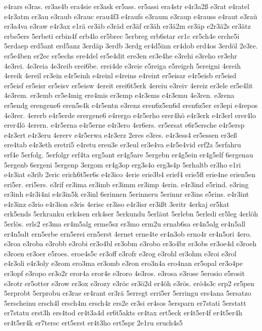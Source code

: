 {e4rars
e3ras.
er3as4b
era4sie
er3ask
er5ass.
er5assi
era4str
e4r3a2ß
e3rat
e4ratel
e4r3atm
er3au
e3raub
e3rauc
erau4f3
e4raufs
e3raum
e3raup
e4rauss
e4raut
e3raü
er3a4va
e3raw
e4r3ax
e1rä
er3äb
e3räd
er3äf
er3äh
er3ä2m
er3äp
e2r3ä2s
er3ätz
erbe5ers
5erbeti
erbin4f
erb4lo
er5brec
5erbreg
erb6star
er1c
er5ch4e
erche5i
5erdaep
erd5ant
erd5anz
3erdäp
3erdb
3erdg
er4d5inn
er4dob
erd4os
3erdöl
2e3re.
er5e4ben
er2ec
er5echs
ere4del
er5e4dit
ere3en
er3e4he
e3rehi
e3reho
er3ehr
4e3rei.
4e3reia
4e3reib
erei6be.
erei4de
e3reie
e5reiga
e5reigeh
5ereigni
4ereih
4ereik
4ereil
er3ein
e4r5einh
e4reinl
e4reins
e4reint
er5eisar
e4r5eisb
er5eisd
er5eisf
er5eisr
er5eisv
er5eisw
4ereit
erei6t5erk
4ereiu
e3reiv
4ereiz
er3ele
er5e4lit
4e3rem.
er3emb
er5e4mig
ere4mis
er3emp
e4r3ems
e4r3emu
4e3ren.
e3rena
er5endg
erengene6
eren5s4k
e4r5entn
e3renz
eren6z5en6d
eren6z5er
er3epi
e4repos
4e3rer.
4ererb
e4r5erde
erergene6
e4rergo
e4r5erho
erer4hö
e4r3erk
e4r3erl
erer4lo
erer4lö
4erern.
e4r5erna
e4r5erne
e4r3ero
4er6ers.
er5ersat
e6r5ersche
e4r5ersp
e4r3ert
e4r3eru
4ererv
e4r5erwa
e4r3erz
2eres
e3res.
e4r3ess4
er5essen
er3eß
ere4tab
e4r3eth
eretri5
e4retu
ereu3e
er3eul
er3e4va
e4r5e4vid
erf2a
5erfahru
erf4e
5erfolg.
5erfolgr
erf4ta
erg5ant
er4g5are
5ergebn
er4g5ein
er4g5elf
6ergenau
5ergenb
6ergeni
5ergenp
3ergom
er4g3op
erg3s4o
erg3s4p
5erhaltb
er3ho
e1ri
e4r3iat
e3rib
2eric
erich6t5er6s
e4r3ico
4erie
erie3b4
erief4
erie5fl
erie4ne
erien5en
eri5er.
eri5ers.
e3rif
er3ima
er3imb
er3imm
er3imp
4erin.
e4r3ind
e5rind.
e3ring
er3inh
e4r3i4ni
e4r3in5k
er3inl
6erinnen
5erinneru
5erinnr
er3ins
e5rins.
e4r3int
e4r3inz
e3rio
e4r3ion
e3ris
4erisc
er3iso
e4r3isr
er3ißt
3eritr
4erkaj
er5kat
erk5ends
5erkranku
erk4sen
erk4ser
5erkundu
5erläut
5erlebn
5erledi
er5leg
4erlöh
5erlös.
erls2
er3ma
er4m5alg
erme5sz
er3mo
erm2u
ernab6sa
er4n5alg
er4n5all
er4n5alt
ern5erbe
ern5erei
ern5erst
4ernet
erne4te
er4n3ob
erno4r
er4n5ori
4ero.
e3roa
e3roba
e3robb
e3robi
er3o4bl
er3obm
e3robo
er3o4br
er3obs
er3oe4d
e3roeh
e3roen
er3oer
e5roes.
eroe4s5c
er3off
e3rofr
e3rog
e3rohl
er3ohm
e3roi
e3rol
e4r3oli
e4r3oly
e3rom
ero3ma
er3omb
e3ron
ero3n4a
ero4nan
er5opal
er3o4pe
er3opf
e3ropo
er3o2r
eror4a
eror4e
e3roro
4e3ros.
e3rosa
e3rose
5erosio
e5rosit
e3rotr
er5otter
e3row
er3ox
e3rozy
e3röc
er3ö2d
er4öh
e3rös.
erö4s3c
erp2
er5pen
5erprobt
5erprobu
er3rae
er4rant
er3rä
5erregt
erri5er
5erringu
ers4ana
5ersatzo
5erscheinu
ersch4l
ersch4m
ersch4r
ers2e
er3si
er4sos
5ersparn
er7stati
5erstatt
er7statu
erst3h
ers4tod
er4t3a4d
er6t5akts
er4tax
ert5eck
er4t5er4f
er4t5er4h
er4t5er4k
er7tersc
ert5erst
er4t3ho
ert5spr
2e1ru
eruch4s5
}
